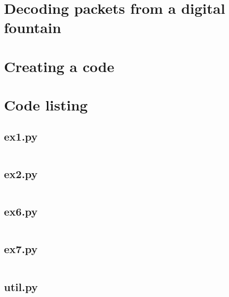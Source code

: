 \documentclass[10pt,a4paper,twoside,twocolumn]{article}
\begin{document}
\section{Decoding packets from a digital fountain}
\section{Creating a code}


\onecolumn
\appendixpage
\appendix

\section{Code listing}

\subsection{ex1.py}\label{app:ex1}
\inputminted{python}{../src/ex1.py}

\subsection{ex2.py}\label{app:ex2}
\inputminted{python}{../src/ex2.py}

\subsection{ex6.py}\label{app:ex6}
\inputminted{python}{../src/ex6.py}

\subsection{ex7.py}\label{app:ex7}
\inputminted{python}{../src/ex7.py}

\subsection{util.py}\label{app:util}
\inputminted{python}{../src/util.py}
\end{document}
